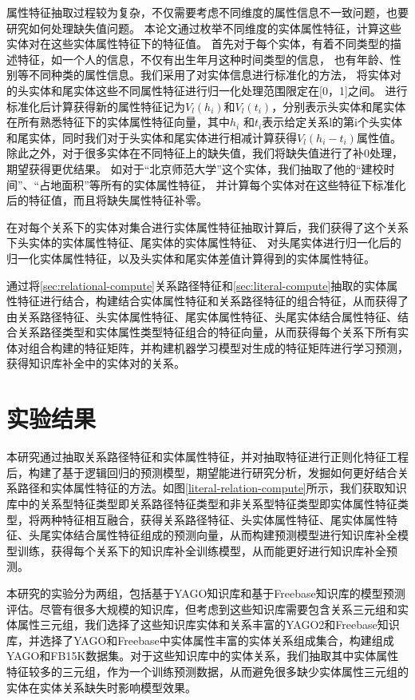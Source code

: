 属性特征抽取过程较为复杂，不仅需要考虑不同维度的属性信息不一致问题，也要研究如何处理缺失值问题。
本论文通过枚举不同维度的实体属性特征，计算这些实体对在这些实体属性特征下的特征值。
首先对于每个实体，有着不同类型的描述特征，如一个人的信息，不仅有出生年月这种时间类型的信息，
也有年龄、性别等不同种类的属性信息。我们采用了对实体信息进行标准化的方法，
将实体对的头实体和尾实体这些不同属性特征进行归一化处理范围限定在[0，1]之间。
进行标准化后计算获得新的属性特征记为$V_l(h_i)$和$V_l (t_i)$，分别表示头实体和尾实体在所有熟悉特征下的实体属性特征向量，其中$h_i$ 和$t_i$表示给定关系l的第i个头实体和尾实体，同时我们对于头实体和尾实体进行相减计算获得$V_l(h_i-t_i )$属性值。除此之外，对于很多实体在不同特征上的缺失值，我们将缺失值进行了补0处理，期望获得更优结果。
如对于“北京师范大学”这个实体，我们抽取了他的“建校时间”、“占地面积”等所有的实体属性特征，
并计算每个实体对在这些特征下标准化后的特征值，而且将缺失属性特征补零。

在对每个关系下的实体对集合进行实体属性特征抽取计算后，我们获得了这个关系下头实体的实体属性特征、尾实体的实体属性特征、
对头尾实体进行归一化后的归一化实体属性特征，以及头实体和尾实体差值计算得到的实体属性特征。

通过将\ref{sec:relational-compute}关系路径特征和\ref{sec:literal-compute}抽取的实体属性特征进行结合，构建结合实体属性特征和关系路径特征的组合特征，从而获得了由关系路径特征、头实体属性特征、尾实体属性特征、头尾实体结合属性特征、结合关系路径类型和实体属性类型特征组合的特征向量，从而获得每个关系下所有实体对组合构建的特征矩阵，并构建机器学习模型对生成的特征矩阵进行学习预测，获得知识库补全中的实体对的关系。


\section{实验结果}

本研究通过抽取关系路径特征和实体属性特征，并对抽取特征进行正则化特征工程后，构建了基于逻辑回归的预测模型，期望能进行研究分析，发掘如何更好结合关系路径和实体属性特征的方法。如图\ref{literal-relation-compute}所示，我们获取知识库中的关系型特征类型即关系路径特征类型和非关系型特征类型即实体属性特征类型，将两种特征相互融合，获得关系路径特征、头实体属性特征、尾实体属性特征、头尾实体结合属性特征组成的预测向量，从而构建预测模型进行知识库补全模型训练，获得每个关系下的知识库补全训练模型，从而能更好进行知识库补全预测。

本研究的实验分为两组，包括基于YAGO知识库和基于Freebase知识库的模型预测评估。尽管有很多大规模的知识库，但考虑到这些知识库需要包含关系三元组和实体属性三元组，我们选择了这些知识库实体和关系丰富的YAGO2和Freebase知识库，并选择了YAGO和Freebase中实体属性丰富的实体关系组成集合，构建组成YAGO和FB15K数据集。对于这些知识库中的实体关系，我们抽取其中实体属性特征较多的三元组，作为一个训练预测数据，从而避免很多缺少实体属性三元组的实体在实体关系缺失时影响模型效果。

